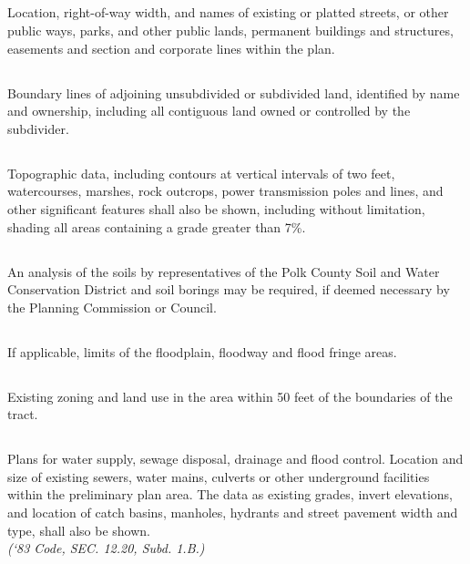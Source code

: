 \subsection{}
Location, right-of-way width, and names of existing or platted streets, or other public ways, parks, and other public lands, permanent buildings and structures, easements and section and corporate lines within the plan.
\subsection{}
Boundary lines of adjoining unsubdivided or subdivided land, identified by name and ownership, including all contiguous land owned or controlled by the subdivider.
\subsection{}
Topographic data, including contours at vertical intervals of two feet, watercourses, marshes, rock outcrops, power transmission poles and lines, and other significant features shall also be shown, including without limitation, shading all areas containing a grade greater than 7\%.
\subsection{}
An analysis of the soils by representatives of the Polk County Soil and Water Conservation District and soil borings may be required, if deemed necessary by the Planning Commission or Council.
\subsection{}
If applicable, limits of the floodplain, floodway and flood fringe areas.
\subsection{}
Existing zoning and land use in the area within 50 feet of the boundaries of the tract.
\subsection{}
Plans for water supply, sewage disposal, drainage and flood control.  Location and size of existing sewers, water mains, culverts or other underground facilities within the preliminary plan area.  The data as existing grades, invert elevations, and location of catch basins, manholes, hydrants and street pavement width and type, shall also be shown.\\
\emph{(‘83 Code, SEC. 12.20, Subd. 1.B.)}
